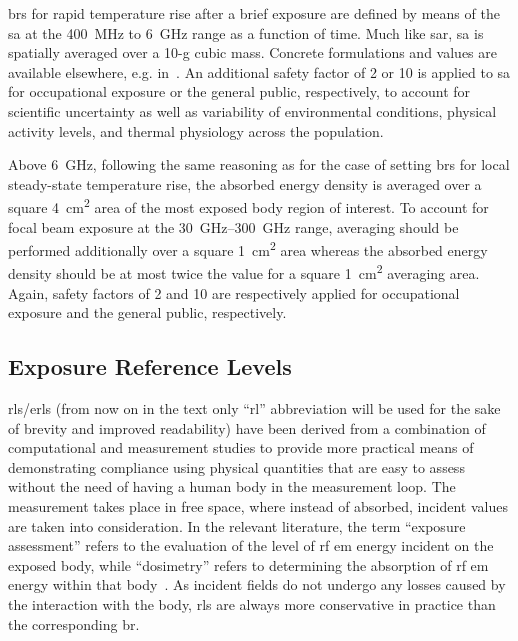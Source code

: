 \Gls{br}s for rapid temperature rise after a brief exposure are defined by means of the \gls{sa} at the \SI{400}{\MHz} to \SI{6}{\GHz} range as a function of time.
Much like \gls{sar}, \gls{sa} is spatially averaged over a 10-g cubic mass.
Concrete formulations and values are available elsewhere, e.g. in~\cite{ICNIRP2020Guidelines,IEEE2019Standard}.
An additional safety factor of 2 or 10 is applied to \gls{sa} for occupational exposure or the general public, respectively, to account for scientific uncertainty as well as variability of environmental conditions, physical activity levels, and thermal physiology across the population.

Above \SI{6}{\GHz}, following the same reasoning as for the case of setting \gls{br}s for local steady-state temperature rise, the absorbed energy density is averaged over a square \SI{4}{\cm\squared} area of the most exposed body region of interest.
To account for focal beam exposure at the \SIrange[range-units=single,range-phrase=--]{30}{300}{\GHz} range, averaging should be performed additionally over a square \SI{1}{\cm\squared} area whereas the absorbed energy density should be at most twice the value for a square \SI{1}{\cm\squared} averaging area.
Again, safety factors of 2 and 10 are respectively applied for occupational exposure and the general public, respectively.

\subsection{Exposure Reference Levels}
\Gls{rl}s/\gls{erl}s (from now on in the text only ``\gls{rl}'' abbreviation will be used for the sake of brevity and improved readability) have been derived from a combination of computational and measurement studies to provide more practical means of demonstrating compliance using physical quantities that are easy to assess without the need of having a human body in the measurement loop.
The measurement takes place in free space, where instead of absorbed, incident values are taken into consideration.
In the relevant literature, the term ``exposure assessment'' refers to the evaluation of the level of \gls{rf} \gls{em} energy incident on the exposed body, while ``dosimetry'' refers to determining the absorption of \gls{rf} \gls{em} energy within that body~\cite{Chou1996Radio}.
As incident fields do not undergo any losses caused by the interaction with the body, \gls{rl}s are always more conservative in practice than the corresponding \gls{br}.

